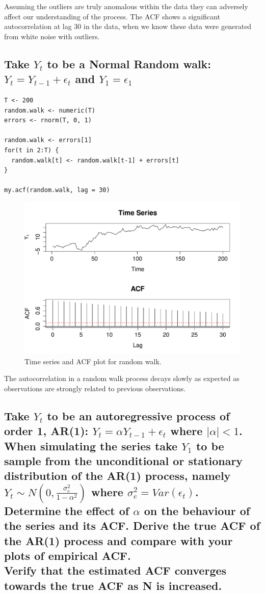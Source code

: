 \documentclass[10pt,a4paper]{article}
\let\Oldsubsection\subsection
\renewcommand{\subsection}{\FloatBarrier\Oldsubsection}
\begin{document}
Assuming the outliers are truly anomalous within the data they can adversely affect our understanding of the process. The ACF shows a significant autocorrelation at lag 30 in the data, when we know these data were generated from white noise with outliers.


\subsection{Take $Y_t$ to be a Normal Random walk: 
$Y_t = Y_{t-1} + \epsilon_t$ and $Y_1 = \epsilon_1$}
\begin{lstlisting}
T <- 200
random.walk <- numeric(T)
errors <- rnorm(T, 0, 1)

random.walk <- errors[1]
for(t in 2:T) {
  random.walk[t] <- random.walk[t-1] + errors[t]
}

my.acf(random.walk, lag = 30)
\end{lstlisting}
\begin{figure}[ht]
\includegraphics[width=\linewidth]{plots/p4.pdf}
\caption{Time series and ACF plot for random walk.}
\end{figure}

The autocorrelation in a random walk process decays slowly as expected as observations are strongly related to previous observations.

\subsection{Take $Y_t$ to be an autoregressive process of order 1, AR(1):
$Y_t = \alpha Y_{t-1} + \epsilon_t$ where $|\alpha| < 1$. \\
When simulating the series take $Y_1$ to be sample from the unconditional or stationary
distribution of the AR(1) process, namely
$Y_t \sim N\left(0, \frac{\sigma_e^2}{1 - \alpha^2}\right)$
where $\sigma_e^2 = Var(\epsilon_t)$.\\
Determine the effect of $\alpha$ on the behaviour of the series and its ACF. Derive the true ACF of the AR(1) process and compare with your plots of
empirical ACF. \\
Verify that the estimated ACF converges towards the true ACF as
N is increased.}
\end{document}
